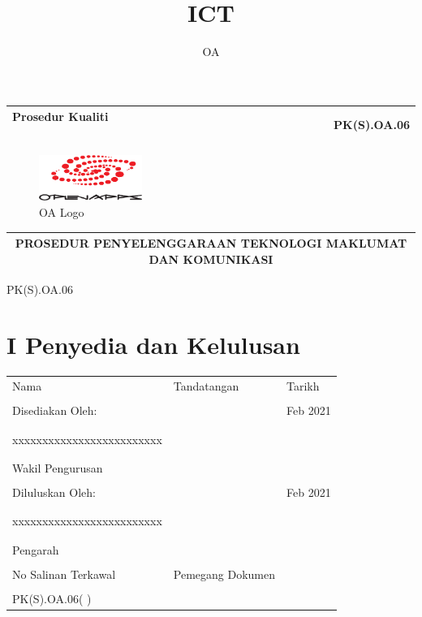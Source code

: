 \documentclass[
]{article}
\title{ICT}
\author{OA}
\date{}
\begin{document}
\maketitle

{
\setcounter{tocdepth}{4}
\tableofcontents
}
\newpage

\begin{longtable}[]{@{}lr@{}}
\toprule
\begin{minipage}[b]{0.66\columnwidth}\raggedright
Prosedur Kualiti ~ ~ ~ ~ ~ ~ ~ ~ ~ ~~ ~ ~ ~ ~ ~ ~ ~ ~ ~~ ~ ~ ~ ~ ~ ~ ~ ~
~~ ~ ~ ~ ~ ~ ~ ~ ~ ~\strut
\end{minipage} & \begin{minipage}[b]{0.28\columnwidth}\raggedleft
PK(S).OA.06\strut
\end{minipage}\tabularnewline
\midrule
\endhead
\bottomrule
\end{longtable}

\begin{figure}
\centering
\includegraphics[width=0.3\textwidth,height=\textheight]{media/openapps-logo.png}
\caption{OA Logo}
\end{figure}

\begin{longtable}[]{@{}c@{}}
\toprule
\endhead
PROSEDUR PENYELENGGARAAN TEKNOLOGI MAKLUMAT DAN
KOMUNIKASI\tabularnewline
\bottomrule
\end{longtable}

PK(S).OA.06

\hypertarget{i-penyedia-dan-kelulusan}{%
\section{I Penyedia dan Kelulusan}\label{i-penyedia-dan-kelulusan}}

\begin{longtable}[]{@{}lll@{}}
\toprule
\endhead
Nama & Tandatangan & Tarikh\tabularnewline
& &\tabularnewline
Disediakan Oleh: & & Feb 2021\tabularnewline
& &\tabularnewline
& &\tabularnewline
xxxxxxxxxxxxxxxxxxxxxxxxx & &\tabularnewline
& &\tabularnewline
& &\tabularnewline
Wakil Pengurusan & &\tabularnewline
& &\tabularnewline
Diluluskan Oleh: & & Feb 2021\tabularnewline
& &\tabularnewline
& &\tabularnewline
xxxxxxxxxxxxxxxxxxxxxxxxx & &\tabularnewline
& &\tabularnewline
& &\tabularnewline
Pengarah & &\tabularnewline
& &\tabularnewline
No Salinan Terkawal & Pemegang Dokumen &\tabularnewline
& &\tabularnewline
PK(S).OA.06( ) & &\tabularnewline
\bottomrule
\end{longtable}
\end{document}
